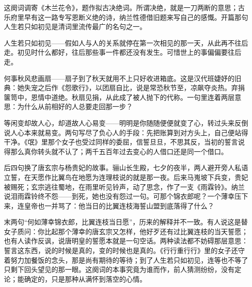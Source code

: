 \begin{appreciation}
这阕词调寄《木兰花令》，题作拟古决绝词。所谓决绝，就是一刀两断的意思；古乐府里早有这一路专写恩断义绝的诗，纳兰性德借旧题来写自己的感慨。开篇那句人生若只如初见是清词里流传最广的名句之一。

人生若只如初见——假如人与人的关系就停在第一次相见的那一天，从此再不往后走。初见时什么都好，往后那些事一件都还没有发生。可惜世上的事偏偏要往后走。

何事秋风悲画扇——扇子到了秋天就用不上只好收进箱底。这是汉代班婕妤的旧典：她失宠之后作《怨歌行》，以团扇自比，说是常恐秋节至，凉飙夺炎热。弃捐箧笥中，恩情中道绝。秋扇见捐，从此成了被人抛下的代称。一句里连着两层意思：为什么从前相好的人总要走回那一步？

等闲变却故人心，却道故人心易变——明明是你随随便便就变了心，转过头来反倒说人心本来就易变。两句写尽了负心人的手段：先把账算到对方头上，自己便站得干净。《氓》里那个女子也受过同样的委屈，信誓旦旦，不思其反，当初的誓言说得那么真你转头就不认了；两千五百年过去变心的人借口还是同一个借口。

后四句换了唐玄宗与杨贵妃的故事。骊山长生殿，七夕的夜半，两人避开旁人私语立誓，在天愿作比翼鸟在地愿为连理枝说的就是那一夜。后来马嵬坡下兵变，贵妃被赐死；玄宗逃往蜀地，在雨里听见铃声，动了思念，作了一支《雨霖铃》。纳兰说泪雨霖铃终不怨——到死，她也没有怨过一句。可那个锦衣郎呢？一个薄幸压下来，连皇帝也一并骂了：他当日的比翼连枝海誓山盟到底落得了什么？

末两句“何如薄幸锦衣郎，比翼连枝当日愿”，历来的解释并不一致。有人说这是替女子质问：你比起那个薄幸的唐玄宗又怎样，他好歹还有过比翼连枝的当天誓愿；也有人读作反讽，说唐明皇的誓愿本就是一句空话。两种读法都不妨碍那层意思：誓言这东西，说的时候是真的，变的时候也是真的。《行行重行行》里的女子还守着努力加餐饭的念头，那是尚有期待的等待；到了人生若只如初见，连等也不等了只剩下回头望见的那一眼。这阕词的本事究竟为谁而作，前人猜测纷纷，没有定论；能确定的，只是那种从满怀到落空的心情。
\end{appreciation}
